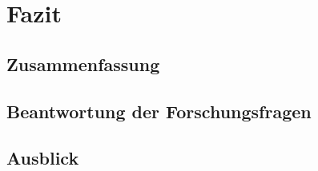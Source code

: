 \section{Fazit}

\subsection{Zusammenfassung}

\subsection{Beantwortung der Forschungsfragen}

\subsection{Ausblick}
